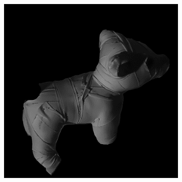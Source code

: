 \documentclass[11pt]{article}
\begin{document}
\begin{figure}[!hbt]
\begin{subfigure}[h]{0.3\textwidth}
  \end{subfigure} 
    \begin{subfigure}[h]{0.3\textwidth}
    \centering
    \includegraphics[width = \textwidth]{../dog-png/dog3.png}
  \end{subfigure} 
  

\end{figure}
\end{document}
